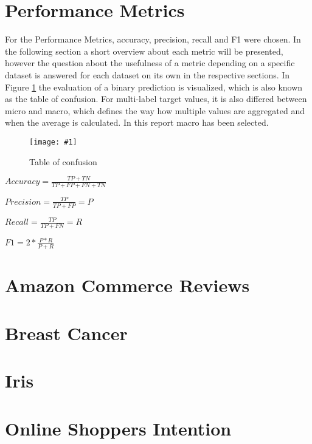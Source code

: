\documentclass{article}
\newcommand{\size}{0.6\textwidth}
\newcommand{\image}[3]{
\begin{figure}[H]
\begin{center}
\texttt{[image: \#1]}
\caption{#2}
#3
\end{center}
\end{figure}
}
\begin{document}
\section{Performance Metrics}
For the Performance Metrics, accuracy, precision, recall and F1 were chosen. In the following section a short overview about each metric will be presented, however the question about the usefulness of a metric depending on a specific dataset is answered for each dataset on its own in the respective sections. In Figure \ref{fig:conf} the evaluation of a binary prediction is visualized, which is also known as the table of confusion. For multi-label target values, it is also differed between micro and macro, which defines the way how multiple values are aggregated and when the average is calculated. In this report macro has been selected.

\image{performance.png}{Table of confusion}{\label{fig:conf}}
\begin{itemize}
\Large{
\item $Accuracy = \frac{TP + TN}{TP + FP + FN + TN}$

\item $Precision = \frac{TP}{TP+FP} = P$

\item $Recall = \frac{TP}{TP+FN} = R$

\item $F1=2*\frac{P*R}{P+R}$
}
\end{itemize}

\section{Amazon Commerce Reviews}


\section{Breast Cancer}


\section{Iris}


\section{Online Shoppers Intention}


\end{document}
